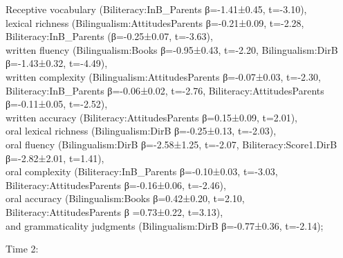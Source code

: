 \documentclass[output=paper,modfonts,nonflat,newtxmath]{langsci/langscibook}
\begin{document}
Receptive vocabulary (Biliteracy:InB\_Parents β=-1.41±0.45, t=-3.10),\\
 lexical richness (Bilingualism:AttitudesParents β=-0.21±0.09, t=-2.28, Biliteracy:InB\_Parents (β=-0.25±0.07, t=-3.63),\\
 written fluency (Bilingualism:Books β=-0.95±0.43, t=-2.20, Bilingualism:DirB β=-1.43±0.32, t=-4.49),\\
 written complexity (Bilingualism:AttitudesParents β=-0.07±0.03, t=-2.30, Biliteracy:InB\_Parents β=-0.06±0.02, t=-2.76, Biliteracy:AttitudesParents β=-0.11±0.05, t=-2.52),\\
 written accuracy (Biliteracy:AttitudesParents β=0.15±0.09, t=2.01),\\
 oral lexical richness (Bilingualism:DirB β=-0.25±0.13, t=-2.03),\\
 oral fluency (Bilingualism:DirB β=-2.58±1.25, t=-2.07, Biliteracy:Score1.DirB β=-2.82±2.01, t=1.41),\\
 oral complexity (Biliteracy:InB\_Parents β=-0.10±0.03, t=-3.03, Biliteracy:AttitudesParents β=-0.16±0.06, t=-2.46),\\
 oral accuracy (Bilingualism:Books β=0.42±0.20, t=2.10, Biliteracy:AttitudesParents β =0.73±0.22, t=3.13),\\
 and grammaticality judgments (Bilingualism:DirB β=-0.77±0.36, t=-2.14);


Time 2:
\end{document}
